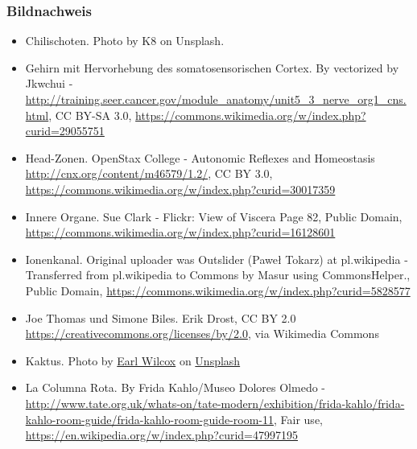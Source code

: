 \documentclass{beamer}
\begin{document}
\begin{frame}
 
\frametitle{Bildnachweis}
 
\begin{tiny}
  

\begin{itemize}

\item
Chilischoten. Photo by K8 on Unsplash. 

\item
Gehirn mit Hervorhebung des somatosensorischen Cortex. By vectorized by Jkwchui - \url{http://training.seer.cancer.gov/module_anatomy/unit5_3_nerve_org1_cns.html}, CC BY-SA 3.0, \url{https://commons.wikimedia.org/w/index.php?curid=29055751}

\item
Head-Zonen. OpenStax College - Autonomic Reflexes and Homeostasis  \url{http://cnx.org/content/m46579/1.2/}, CC BY 3.0, \url{https://commons.wikimedia.org/w/index.php?curid=30017359}

\item
Innere Organe.  Sue Clark - Flickr: View of Viscera Page 82, Public Domain, \url{https://commons.wikimedia.org/w/index.php?curid=16128601}

\item
Ionenkanal.  Original uploader was Outslider (Paweł Tokarz) at pl.wikipedia - Transferred from pl.wikipedia to Commons by Masur using CommonsHelper., Public Domain, \url{https://commons.wikimedia.org/w/index.php?curid=5828577}
\item
Joe Thomas und Simone Biles. Erik Drost, CC BY 2.0 \url{https://creativecommons.org/licenses/by/2.0}, via Wikimedia Commons

\item
Kaktus. Photo by \href{https://unsplash.com/@earl_plannerzone?utm_source=unsplash&utm_medium=referral&utm_content=creditCopyText}{Earl Wilcox} on \href{https://unsplash.com/s/photos/pain?utm_source=unsplash&utm_medium=referral&utm_content=creditCopyText}{Unsplash}

\item
La Columna Rota. By Frida Kahlo/Museo Dolores Olmedo - \url{http://www.tate.org.uk/whats-on/tate-modern/exhibition/frida-kahlo/frida-kahlo-room-guide/frida-kahlo-room-guide-room-11}, Fair use, \url{https://en.wikipedia.org/w/index.php?curid=47997195}



\end{itemize}
\end{tiny}

\end{frame}
\end{document}
